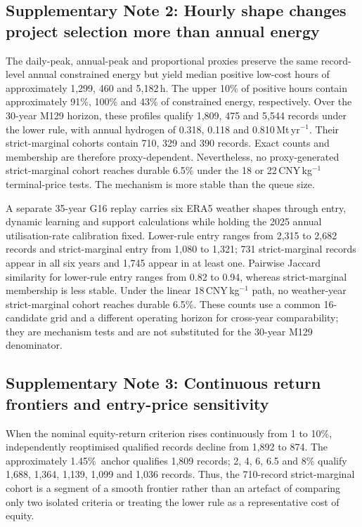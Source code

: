 \documentclass[pdflatex,sn-nature]{sn-jnl}
\newcommand{\lowhurdle}{approximately 1.45\%}
\begin{document}
\subsection*{Supplementary Note 2: Hourly shape changes project selection more than annual energy}

The daily-peak, annual-peak and proportional proxies preserve the same record-level annual constrained energy but yield median positive low-cost hours of approximately 1,299, 460 and 5,182\,h. The upper 10\% of positive hours contain approximately 91\%, 100\% and 43\% of constrained energy, respectively. Over the 30-year M129 horizon, these profiles qualify 1,809, 475 and 5,544 records under the lower rule, with annual hydrogen of 0.318, 0.118 and 0.810\,Mt\,yr$^{-1}$. Their strict-marginal cohorts contain 710, 329 and 390 records. Exact counts and membership are therefore proxy-dependent. Nevertheless, no proxy-generated strict-marginal cohort reaches durable 6.5\% under the 18 or 22\,CNY\,kg$^{-1}$ terminal-price tests. The mechanism is more stable than the queue size.

A separate 35-year G16 replay carries six ERA5 weather shapes through entry, dynamic learning and support calculations while holding the 2025 annual utilisation-rate calibration fixed. Lower-rule entry ranges from 2,315 to 2,682 records and strict-marginal entry from 1,080 to 1,321; 731 strict-marginal records appear in all six years and 1,745 appear in at least one. Pairwise Jaccard similarity for lower-rule entry ranges from 0.82 to 0.94, whereas strict-marginal membership is less stable. Under the linear 18\,CNY\,kg$^{-1}$ path, no weather-year strict-marginal cohort reaches durable 6.5\%. These counts use a common 16-candidate grid and a different operating horizon for cross-year comparability; they are mechanism tests and are not substituted for the 30-year M129 denominator.

\subsection*{Supplementary Note 3: Continuous return frontiers and entry-price sensitivity}

When the nominal equity-return criterion rises continuously from 1 to 10\%, independently reoptimised qualified records decline from 1,892 to 874. The \lowhurdle\ anchor qualifies 1,809 records; 2, 4, 6, 6.5 and 8\% qualify 1,688, 1,364, 1,139, 1,099 and 1,036 records. Thus, the 710-record strict-marginal cohort is a segment of a smooth frontier rather than an artefact of comparing only two isolated criteria or treating the lower rule as a representative cost of equity.
\end{document}
